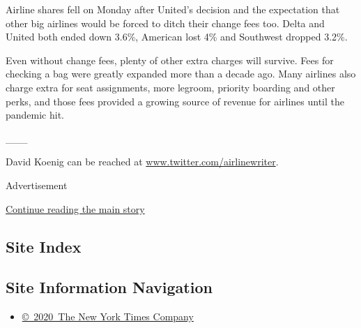 Airline shares fell on Monday after United's decision and the
expectation that other big airlines would be forced to ditch their
change fees too. Delta and United both ended down 3.6\%, American lost
4\% and Southwest dropped 3.2\%.

Even without change fees, plenty of other extra charges will survive.
Fees for checking a bag were greatly expanded more than a decade ago.
Many airlines also charge extra for seat assignments, more legroom,
priority boarding and other perks, and those fees provided a growing
source of revenue for airlines until the pandemic hit.

\_\_\_

David Koenig can be reached at
\href{http://www.twitter.com/airlinewriter}{www.twitter.com/airlinewriter}.

Advertisement

\protect\hyperlink{after-bottom}{Continue reading the main story}

\hypertarget{site-index}{%
\subsection{Site Index}\label{site-index}}

\hypertarget{site-information-navigation}{%
\subsection{Site Information
Navigation}\label{site-information-navigation}}

\begin{itemize}
\tightlist
\item
  \href{https://help.nytimes3xbfgragh.onion/hc/en-us/articles/115014792127-Copyright-notice}{©~2020~The
  New York Times Company}
\end{itemize}

